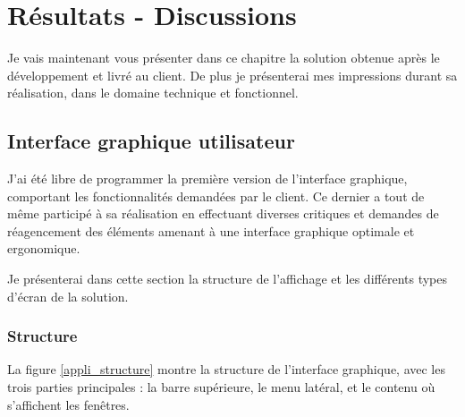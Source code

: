\cleardoublepage

\chapter{Résultats - Discussions}

Je vais maintenant vous présenter dans ce chapitre la solution obtenue après le développement et livré au client.
De plus je présenterai mes impressions durant sa réalisation, dans le domaine technique et fonctionnel.


\section{Interface graphique utilisateur}

J'ai été libre de programmer la première version de l'interface graphique, comportant les fonctionnalités demandées par le client.
Ce dernier a tout de même participé à sa réalisation en effectuant diverses critiques et demandes de réagencement des éléments amenant à une interface graphique optimale et ergonomique.

Je présenterai dans cette section la structure de l'affichage et les différents types d'écran de la solution.


\subsection{Structure}

La figure \ref{appli_structure} montre la structure de l'interface graphique, avec les trois parties principales : la barre supérieure, le menu latéral, et le contenu où s'affichent les fenêtres.

